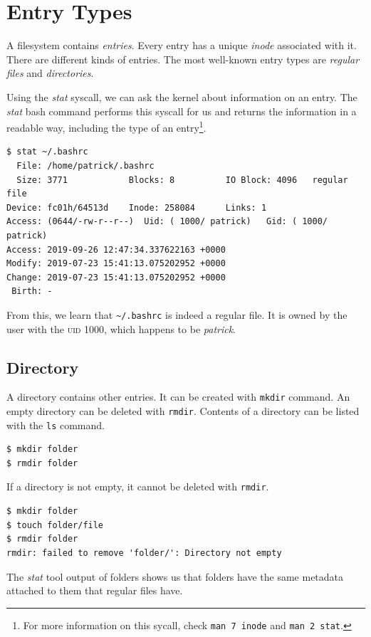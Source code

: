\documentclass[a4paper]{article}
\begin{document}
\section{Entry Types}

A filesystem contains \emph{entries}. Every entry has a unique \emph{inode} associated with it. There are different kinds of entries. The most well-known entry types are \emph{regular files} and \emph{directories}. 

Using the \emph{stat} syscall, we can ask the kernel about information on an entry. The \emph{stat} bash command performs this syscall for us and returns the information in a readable way, including the type of an entry\footnote{For more information on this sycall, check \texttt{man 7 inode} and \texttt{man 2 stat}.}.

\begin{verbatim}
$ stat ~/.bashrc
  File: /home/patrick/.bashrc
  Size: 3771            Blocks: 8          IO Block: 4096   regular file
Device: fc01h/64513d    Inode: 258084      Links: 1
Access: (0644/-rw-r--r--)  Uid: ( 1000/ patrick)   Gid: ( 1000/ patrick)
Access: 2019-09-26 12:47:34.337622163 +0000
Modify: 2019-07-23 15:41:13.075202952 +0000
Change: 2019-07-23 15:41:13.075202952 +0000
 Birth: -  
\end{verbatim}
From this, we learn that \verb|~/.bashrc| is indeed a regular file. It is owned by the user with the \textsc{uid} 1000, which happens to be \emph{patrick}. 

\subsection{Directory}

A directory contains other entries. It can be created with \verb|mkdir| command. An empty directory can be deleted with \verb|rmdir|. Contents of a directory can be listed with the \verb|ls| command.

\begin{verbatim}
$ mkdir folder
$ rmdir folder  
\end{verbatim}
If a directory is not empty, it cannot be deleted with \verb|rmdir|.

\begin{verbatim}
$ mkdir folder
$ touch folder/file
$ rmdir folder
rmdir: failed to remove 'folder/': Directory not empty
\end{verbatim}
The \emph{stat} tool output of folders shows us that folders have the same metadata attached to them that regular files have.
\end{document}
